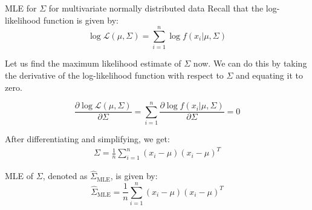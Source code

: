 \documentclass[handout]{beamer}
\begin{document}
\begin{frame}{MLE for $\Sigma$ for multivariate normally distributed data}
    Recall that the log-likelihood function is given by:
    \begin{equation}
        \log \mathcal{L}(\mu, \Sigma) = \sum_{i=1}^n \log f(x_i|\mu, \Sigma)
    \end{equation}

    Let us find the maximum likelihood estimate of $\Sigma$ now. We can do this by taking the derivative of the log-likelihood function with respect to $\Sigma$ and equating it to zero.   

    \begin{equation}
        \frac{\partial \log \mathcal{L}(\mu, \Sigma)}{\partial \Sigma} = \sum_{i=1}^n \frac{\partial \log f(x_i|\mu, \Sigma)}{\partial \Sigma} = 0
    \end{equation}
    
\end{frame}
\begin{frame}
    After differentiating and simplifying, we get:
    \begin{align*}
      \Sigma = \frac{1}{n}\sum_{i=1}^n(x_i-\mu)(x_i-\mu)^T  
    \end{align*} 

    \begin{tcolorbox}[colback=metropolisblue!5,colframe=metropolisblue,title=Maximum Likelihood Estimate for $\Sigma$]
        MLE of $\Sigma$, denoted as $\hat{\Sigma}_{\text{MLE}}$, is given by:
        \begin{equation*}
            \hat{\Sigma}_{\text{MLE}} = \frac{1}{n}\sum_{i=1}^n (x_i-\mu)(x_i-\mu)^T
        \end{equation*}
    \end{tcolorbox}
\end{frame}
\end{document}
